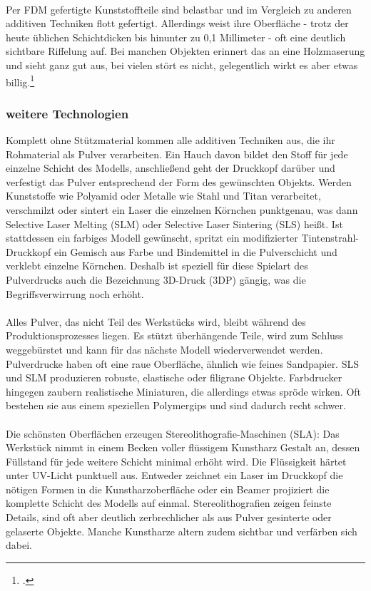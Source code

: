 \\

\noindent
Per FDM gefertigte Kunststoffteile sind belastbar und im Vergleich zu anderen additiven Techniken flott gefertigt. Allerdings weist ihre Oberfläche - trotz der heute üblichen Schichtdicken bis hinunter zu 0,1 Millimeter - oft eine deutlich sichtbare Riffelung auf. Bei manchen Objekten erinnert das an eine Holzmaserung und sieht ganz gut aus, bei vielen stört es nicht, gelegentlich wirkt es aber etwas billig.\footcite{shit_3d_spiegel}

\subsubsection{weitere Technologien}
Komplett ohne Stützmaterial kommen alle additiven Techniken aus, die ihr Rohmaterial als Pulver verarbeiten. Ein Hauch davon bildet den Stoff für jede einzelne Schicht des Modells, anschließend geht der Druckkopf darüber und verfestigt das Pulver entsprechend der Form des gewünschten Objekts. Werden Kunststoffe wie Polyamid oder Metalle wie Stahl und Titan verarbeitet, verschmilzt oder sintert ein Laser die einzelnen Körnchen punktgenau, was dann Selective Laser Melting (SLM) oder Selective Laser Sintering (SLS) heißt. Ist stattdessen ein farbiges Modell gewünscht, spritzt ein modifizierter Tintenstrahl-Druckkopf ein Gemisch aus Farbe und Bindemittel in die Pulverschicht und verklebt einzelne Körnchen. Deshalb ist speziell für diese Spielart des Pulverdrucks auch die Bezeichnung 3D-Druck (3DP) gängig, was die Begriffsverwirrung noch erhöht.\\
\\
Alles Pulver, das nicht Teil des Werkstücks wird, bleibt während des Produktionsprozesses liegen. Es stützt überhängende Teile, wird zum Schluss weggebürstet und kann für das nächste Modell wiederverwendet werden. Pulverdrucke haben oft eine raue Oberfläche, ähnlich wie feines Sandpapier. SLS und SLM produzieren robuste, elastische oder filigrane Objekte. Farbdrucker hingegen zaubern realistische Miniaturen, die allerdings etwas spröde wirken. Oft bestehen sie aus einem speziellen Polymergips und sind dadurch recht schwer.\\
\\
Die schönsten Oberflächen erzeugen Stereolithografie-Maschinen (SLA): Das Werkstück nimmt in einem Becken voller flüssigem Kunstharz Gestalt an, dessen Füllstand für jede weitere Schicht minimal erhöht wird. Die Flüssigkeit härtet unter UV-Licht punktuell aus. Entweder zeichnet ein Laser im Druckkopf die nötigen Formen in die Kunstharzoberfläche oder ein Beamer projiziert die komplette Schicht des Modells auf einmal. Stereolithografien zeigen feinste Details, sind oft aber deutlich zerbrechlicher als aus Pulver gesinterte oder gelaserte Objekte. Manche Kunstharze altern zudem sichtbar und verfärben sich dabei.\\
